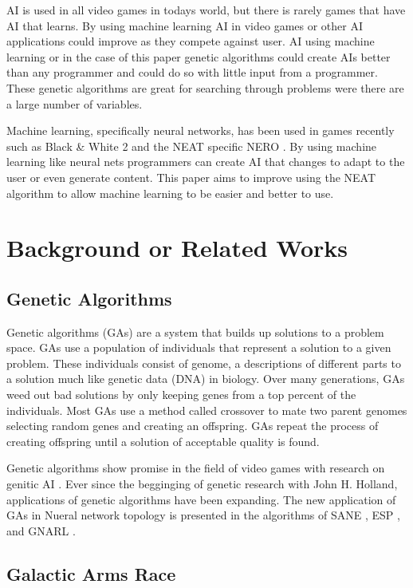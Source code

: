 \documentclass[12pt]{ucthesis} \newif\ifpdf \ifx\pdfoutput\undefined
\begin{document}
AI is used in all video games in todays world, but there is rarely games that
have AI that learns. By using machine learning AI in video games or other AI
applications could improve as they compete against user. AI using machine
learning or in the case of this paper genetic algorithms could create AIs better
than any programmer and could do so with little input from a programmer. These
genetic algorithms are great for searching through problems were there are a
large number of variables. 

Machine learning, specifically neural networks, has been used in games recently
such as Black & White 2 and the NEAT specific NERO \cite{hastings2009evolving}.
By using machine learning like neural nets programmers can create AI that
changes to adapt to the user or even generate content. This paper aims to
improve using the NEAT algorithm to allow machine learning to be easier and
better to use. 
 

\chapter{Background or Related Works}


\section{Genetic Algorithms}

Genetic algorithms (GAs) are a system that builds up solutions to a problem
space. GAs use a population of individuals that represent a solution to a given
problem. These individuals consist of genome, a descriptions of different parts
to a solution much like genetic data (DNA) in biology. Over many generations,
GAs weed out bad solutions by only keeping genes from a top percent of the
individuals. Most GAs use a method called crossover to mate two parent genomes
selecting random genes and creating an offspring. GAs repeat the process of
creating offspring until a solution of acceptable quality is found.

Genetic algorithms show promise in the field of video games with research on
genitic AI \cite{Revello,PengHuo,Chih-Sheng}. Ever since the begginging of
genetic research with John H. Holland, applications of genetic algorithms have
been expanding. The new application of GAs in Nueral network topology is
presented in the algorithms of SANE \cite{moriarty:focus} , ESP
\cite{gomez:proposal} , and GNARL \cite{Angeline}.


\section{Galactic Arms Race}
\end{document}
